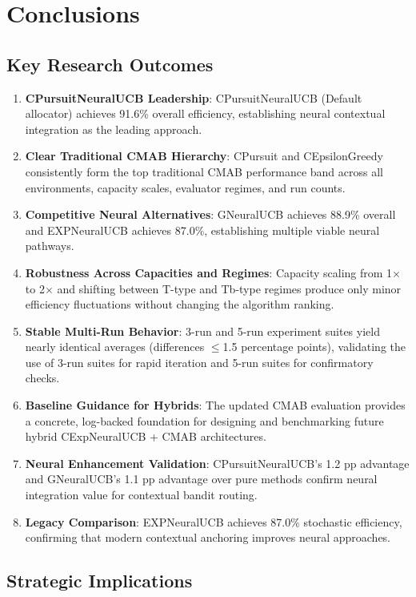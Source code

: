 \documentclass[12pt,a4paper]{article}
\newcommand{\legacy}[1]{\textcolor{legacycolor}{\textbf{#1}}}
\newcommand{\neural}[1]{\textcolor{neuralcolor}{\textbf{#1}}}
\begin{document}
\section{Conclusions}

\subsection{Key Research Outcomes}

\begin{enumerate}
\item \neural{CPursuitNeuralUCB Leadership}: CPursuitNeuralUCB (Default allocator) achieves 91.6\% overall efficiency, establishing neural contextual integration as the leading approach.
\item \textbf{Clear Traditional CMAB Hierarchy}: CPursuit and CEpsilonGreedy consistently form the top traditional CMAB performance band across all environments, capacity scales, evaluator regimes, and run counts.
\item \neural{Competitive Neural Alternatives}: GNeuralUCB achieves 88.9\% overall and EXPNeuralUCB achieves 87.0\%, establishing multiple viable neural pathways.
\item \textbf{Robustness Across Capacities and Regimes}: Capacity scaling from 1$\times$ to 2$\times$ and shifting between T-type and Tb-type regimes produce only minor efficiency fluctuations without changing the algorithm ranking.
\item \textbf{Stable Multi-Run Behavior}: 3-run and 5-run experiment suites yield nearly identical averages (differences $\leq$1.5 percentage points), validating the use of 3-run suites for rapid iteration and 5-run suites for confirmatory checks.
\item \textbf{Baseline Guidance for Hybrids}: The updated CMAB evaluation provides a concrete, log-backed foundation for designing and benchmarking future hybrid CExpNeuralUCB + CMAB architectures.
\item \neural{Neural Enhancement Validation}: CPursuitNeuralUCB's 1.2 pp advantage and GNeuralUCB's 1.1 pp advantage over pure methods confirm neural integration value for contextual bandit routing.
\item \legacy{Legacy Comparison}: EXPNeuralUCB achieves 87.0\% stochastic efficiency, confirming that modern contextual anchoring improves neural approaches.
\end{enumerate}

\subsection{Strategic Implications}
\end{document}
